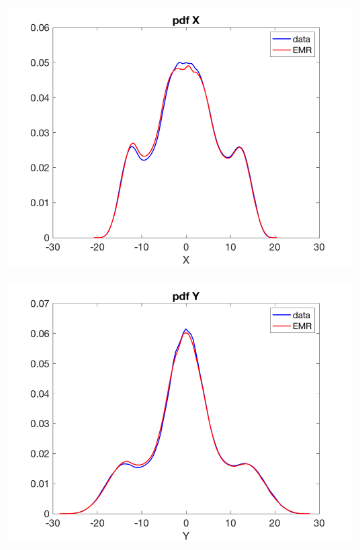 \documentclass[12pt]{article}
\begin{document}
\begin{figure}[H]
	\centering
	\begin{subfigure}[b]{0.3\textwidth}
		\centering
		\includegraphics[width=\textwidth]{plots/l63/pdfxl63.png}
	\end{subfigure}
	\hfill
	\begin{subfigure}[b]{0.3\textwidth}
		\centering
		\includegraphics[width=\textwidth]{plots/l63/pdfyl63.png}
	\end{subfigure}
	\hfill
	\begin{subfigure}[b]{0.3\textwidth}
		\centering

\end{subfigure}
\end{figure}
\end{document}
